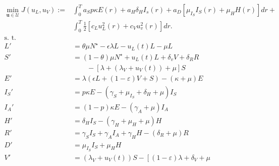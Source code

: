 \begin{equation}
    \label{eqn:lockdown_vaccination_ocp}
    \begin{aligned}
        \min_{\mathbf{u} \in \mathcal{U}}
            J(u_L, u_V) := &
                \int_0 ^  T
                    a_S p \kappa E(r) +
                    a_H \delta_H I_s(r) +
                    a_D
                    \left[
                        \mu_{I_S} I_S(r) + \mu_H H(r)
                    \right]
                dr +
        \\
                &
                \int_0^T
                    \frac{1}{2}
                    \left[
                        c_L u_L^2(r) +
                        c_V u_v^2(r)
                    \right]
                    dr.
        \\
            \text{s. t.} &
        \\
            L' & =  \theta \mu N^{\star}
                -\epsilon \lambda L - u_L(t) L - \mu L
        \\
            S' & =
                (1 - \theta) \mu N^\star
                + u_L(t) L
                + \delta_v V
                + \delta_R R
        \\
                & \qquad -
                \left[
                \lambda + (\lambda_V + u_V(t)) + \mu
                \right] S
        \\
            E' &=
                \lambda (\epsilon L + (1-\varepsilon) V + S)
                - (\kappa + \mu) E
        \\
            I_S' &=
                p \kappa E
                - (\gamma_S +
                    \mu_{I_S} +
                    \delta_H +
                    \mu) I_S
        \\
            I_A' &=
                (1 - p) \kappa E - (\gamma_A + \mu) I_A
        \\
            H' &=
                \delta_H I_S - (\gamma_H + \mu_H + \mu) H
        \\
            R'  &=
                \gamma_S I_S +
                \gamma_A I_A +
                \gamma_H H %
                - (\delta_R + \mu) R
        \\
            D' &=
                \mu_{I_S} I_S + \mu_H H
        \\
            V' &=
                (\lambda_V + u_V(t)) S
                - \left[
                (1 - \varepsilon) \lambda
                + \delta_V
                + \mu

\end{aligned}
\end{equation}
